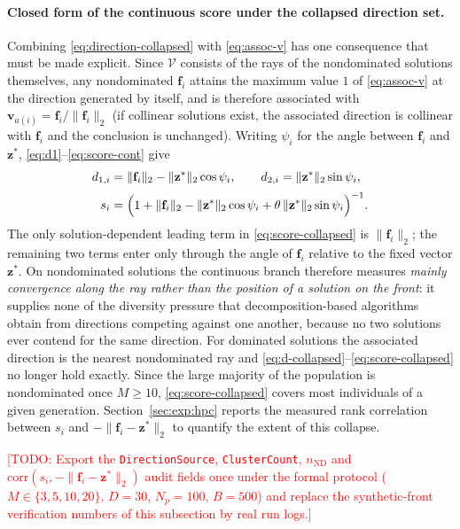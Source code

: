 \documentclass[11pt,a4paper]{article}
\newcommand{\vf}{\mathbf{f}}
\newcommand{\vv}{\mathbf{v}}
\newcommand{\vz}{\mathbf{z}}
\newcommand{\TODO}[1]{\textcolor{red}{[TODO: #1]}}
\begin{document}
\paragraph{Closed form of the continuous score under the collapsed direction set.}
Combining \eqref{eq:direction-collapsed} with \eqref{eq:assoc-v} has one
consequence that must be made explicit. Since $\mathcal{V}$ consists of the rays
of the nondominated solutions themselves, any nondominated $\vf_i$ attains the
maximum value $1$ of \eqref{eq:assoc-v} at the direction generated by itself, and
is therefore associated with $\vv_{a(i)}=\vf_i/\|\vf_i\|_2$ (if collinear
solutions exist, the associated direction is collinear with $\vf_i$ and the
conclusion is unchanged). Writing $\psi_i$ for the angle between $\vf_i$ and
$\vz^{*}$, \eqref{eq:d1}--\eqref{eq:score-cont} give
\begin{align}
d_{1,i}&=\|\vf_i\|_2-\|\vz^{*}\|_2\cos\psi_i,
\qquad
d_{2,i}=\|\vz^{*}\|_2\sin\psi_i,
\label{eq:d-collapsed}\\[2pt]
s_i&=\Bigl(1+\|\vf_i\|_2-\|\vz^{*}\|_2\cos\psi_i
+\theta\,\|\vz^{*}\|_2\sin\psi_i\Bigr)^{-1}.
\label{eq:score-collapsed}
\end{align}
The only solution-dependent leading term in \eqref{eq:score-collapsed} is
$\|\vf_i\|_2$; the remaining two terms enter only through the angle of $\vf_i$
relative to the fixed vector $\vz^{*}$. On nondominated solutions the continuous
branch therefore measures \emph{mainly convergence along the ray rather than the
position of a solution on the front}: it supplies none of the diversity pressure
that decomposition-based algorithms obtain from directions competing against one
another, because no two solutions ever contend for the same direction. For
dominated solutions the associated direction is the nearest nondominated ray and
\eqref{eq:d-collapsed}--\eqref{eq:score-collapsed} no longer hold exactly. Since
the large majority of the population is nondominated once $M\geq10$,
\eqref{eq:score-collapsed} covers most individuals of a given generation.
Section~\ref{sec:exp:hpc} reports the measured rank correlation between $s_i$ and
$-\|\vf_i-\vz^{*}\|_2$ to quantify the extent of this collapse.

\TODO{Export the \texttt{DirectionSource}, \texttt{ClusterCount},
$n_{\mathrm{ND}}$ and $\mathrm{corr}(s_i,-\|\vf_i-\vz^{*}\|_2)$ audit fields once
under the formal protocol ($M\in\{3,5,10,20\}$, $D=30$, $N_p=100$, $B=500$) and
replace the synthetic-front verification numbers of this subsection by real run
logs.}
\end{document}

